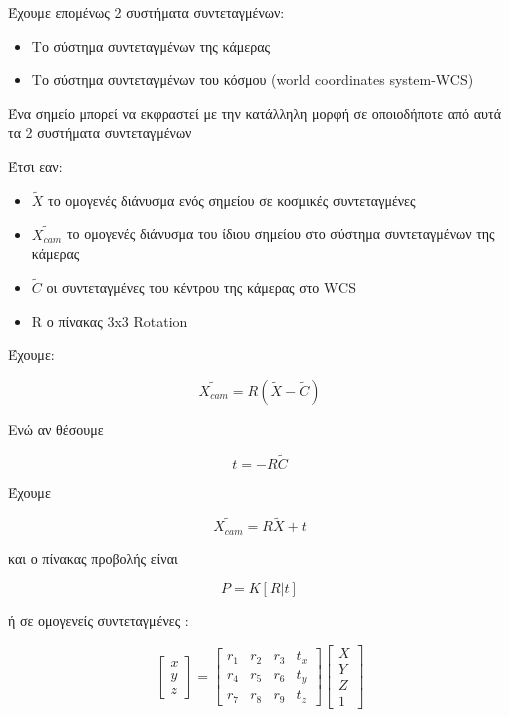 Έχουμε επομένως 2 συστήματα συντεταγμένων:

\begin{itemize}
\item Το σύστημα συντεταγμένων της κάμερας 
\item Το σύστημα συντεταγμένων του κόσμου (world coordinates system-WCS)
\end{itemize}


Ένα σημείο μπορεί να εκφραστεί με την κατάλληλη μορφή σε οποιοδήποτε από αυτά τα 2 συστήματα συντεταγμένων

Έτσι εαν:

\begin{itemize}
\item $\tilde{X}$ το ομογενές διάνυσμα ενός σημείου σε κοσμικές συντεταγμένες
\item $\tilde{X_{cam}}$ το ομογενές διάνυσμα του ίδιου σημείου στο σύστημα συντεταγμένων της κάμερας
\item $\tilde{C}$ οι συντεταγμένες του κέντρου της κάμερας στο WCS
\item R ο πίνακας 3x3 Rotation
\end{itemize}

Έχουμε:

\begin{equation}
\tilde{X_{cam}}=R(\tilde{X}-\tilde{C})
\end{equation}

Ενώ αν θέσουμε 


\begin{equation}
t=-R\tilde{C}
\end{equation}


Έχουμε 

\begin{equation}
\tilde{X_{cam}}=R\tilde{X}+t
\end{equation}


και ο πίνακας προβολής είναι

\begin{equation}
P=K [R \! | \!t]
\end{equation}





ή σε ομογενείς συντεταγμένες :

\begin{equation}
\begin{bmatrix}
x \\ y \\ z
\end{bmatrix}
=
\begin{bmatrix}
r_{1} & r_{2} & r_{3} & t_{x}\\
r_{4} & r_{5} & r_{6} & t_{y}\\
r_{7} & r_{8} & r_{9} & t_{z}
\end{bmatrix}
\begin{bmatrix}
X\\
Y\\
Z\\
1
\end{bmatrix}
\end{equation}

